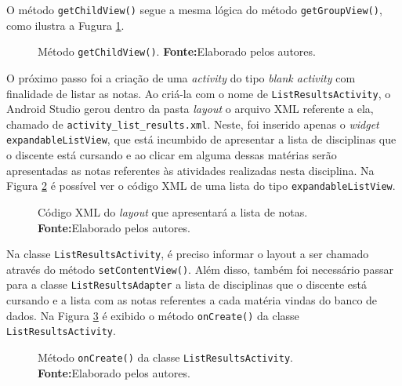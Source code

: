 	\pagebreak

	\par O método \texttt{getChildView()} segue a mesma lógica do método
\texttt{getGroupView()}, como ilustra a Fugura \ref{fig:app14}.

	\begin{figure}[h!] 
		
		\caption[Método getChildView()]{Método \texttt{getChildView()}.
		\textbf{Fonte:}Elaborado pelos autores.}
		\label{fig:app14}
	\end{figure}
	
	\par O próximo passo foi a criação de uma \textit{activity} do tipo
\textit{blank activity} com finalidade de listar as notas. Ao criá-la com o
nome de \texttt{ListResultsActivity}, o Android Studio gerou dentro da pasta
\textit{layout} o arquivo XML referente a ela, chamado de
\texttt{activity\_list\_results.xml}. Neste, foi inserido apenas o
\textit{widget} \texttt{expandableListView}, que está incumbido de apresentar
a lista de disciplinas que o discente está cursando e ao clicar em alguma
dessas matérias serão apresentadas as notas referentes às atividades
realizadas nesta disciplina. Na Figura \ref{fig:app15} é possível ver o código XML de uma
lista do tipo \texttt{expandableListView}.

	\begin{figure}[h!] 
		
		\caption[Código XML do layout que apresentará a lista de notas]{Código XML do
		\textit{layout} que apresentará a lista de notas.
		\textbf{Fonte:}Elaborado pelos autores.}
		\label{fig:app15}
	\end{figure}
	
	\pagebreak
	
	\par Na classe \texttt{ListResultsActivity}, é preciso informar o layout a ser
chamado através do método \texttt{setContentView()}. Além disso, também foi
necessário passar para a classe \texttt{ListResultsAdapter} a lista de
disciplinas que o discente está cursando e a lista com as notas referentes a
cada matéria vindas do banco de dados. Na Figura \ref{fig:app16} é exibido o
método \texttt{onCreate()} da classe \texttt{ListResultsActivity}. 
	
	
	\begin{figure}[h!] 
		
		\caption[ Método onCreate() da classe ListResultsActivity]{ Método
		\texttt{onCreate()} da classe \texttt{ListResultsActivity}.
		\textbf{Fonte:}Elaborado pelos autores.}
		\label{fig:app16}
	\end{figure}

